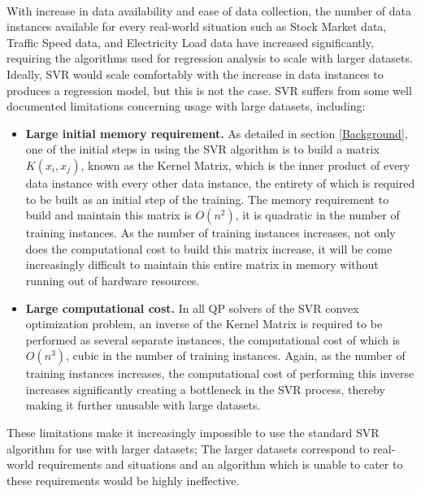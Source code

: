 \documentclass[12pt]{article}
\begin{document}
\ \\
With increase in data availability and ease of data collection, the number of data instances available for every real-world situation such as Stock Market data, Traffic Speed data, and Electricity Load data have increased significantly, requiring the algorithms used for regression analysis to scale with larger datasets.
\newline\newline
Ideally, SVR would scale comfortably with the increase in data instances to produces a regression model, but this is not the case. SVR suffers from some well documented limitations concerning usage with large datasets, including:
\begin{itemize}
\item {\bf Large initial memory requirement.} As detailed in section \ref{Background}, one of the initial steps in using the SVR algorithm is to build a matrix $K(x_{i}, x_{j})$, known as the Kernel Matrix, which is the inner product of every data instance with every other data instance, the entirety of which is required to be built as an initial step of the training. The memory requirement to build and maintain this matrix is $O(n^2)$, it is quadratic in the number of training instances. As the number of training instances increases, not only does the computational cost to build this matrix increase, it will be come increasingly difficult to maintain this entire matrix in memory without running out of hardware resources.

\item {\bf Large computational cost.} In all QP solvers of the SVR convex optimization problem, an inverse of the Kernel Matrix is required to be performed as several separate instances, the computational cost of which is $O(n^3)$, cubic in the number of training instances. Again, as the number of training instances increases, the computational cost of performing this inverse increases significantly creating a bottleneck in the SVR process, thereby making it further unusable with large datasets.
\end{itemize}

These limitations make it increasingly impossible to use the standard SVR algorithm for use with larger datasets; The larger datasets correspond to real-world requirements and situations and an algorithm which is unable to cater to these requirements would be highly ineffective.
\end{document}
